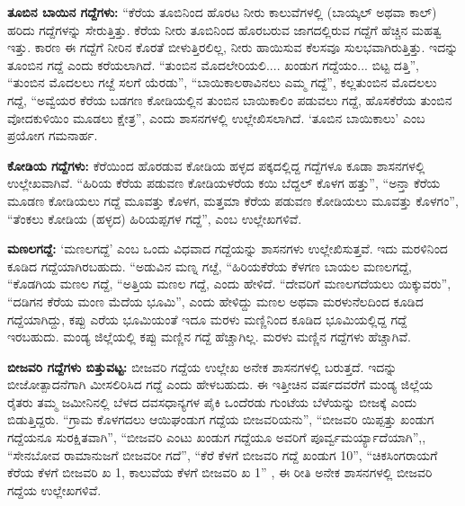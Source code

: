 \vskip 2pt

\textbf{ತೂಬಿನ ಬಾಯಿನ ಗದ್ದೆಗಳು:} “ಕೆರೆಯ ತೂಬಿನಿಂದ ಹೊರಟ ನೀರು ಕಾಲುವೆಗಳಲ್ಲಿ (ಬಾಯ್ಕಲ್​ ಅಥವಾ ಕಾಲ್​) ಹರಿದು ಗದ್ದೆಗಳನ್ನು ಸೇರುತ್ತಿತ್ತು. ಕೆರೆಯ ನೀರು ತೂಬಿನಿಂದ ಹೊರಬರುವ ಜಾಗದಲ್ಲಿರುವ ಗದ್ದೆಗೆ ಹೆಚ್ಚಿನ ಮಹತ್ವ ಇತ್ತು. ಕಾರಣ ಈ ಗದ್ದೆಗೆ ನೀರಿನ ಕೊರತೆ ಬೀಳುತ್ತಿರಲಿಲ್ಲ, ನೀರು ಹಾಯಿಸುವ ಕೆಲಸವೂ ಸುಲಭವಾಗಿರುತ್ತಿತ್ತು. ಇದನ್ನು ತೂಂಬಿನ ಗದ್ದೆ ಎಂದು ಕರೆಯಲಾಗಿದೆ. “ತುಂಬಿನ ಮೊದಲೇರಿಯಲಿ.... ಖಂಡುಗ ಗದ್ದೆಯಂ... ಬಿಟ್ಟ ದತ್ತಿ”, “ತುಂಬಿನ ಮೊದಲಲು ಗೞ್ದೆ ಸಲಗೆ ಯೆರಡು”, “ಬಾಯಿಕಾಲಠಾವಿನಲು ಎಮ್ಮ ಗದ್ದೆ”, ಕಲ್ಲತುಂಬಿನ ಮೊದಲಲು ಗದ್ದೆ, “ಅವ್ವೆಯರ ಕೆರೆಯ ಬಡಗಣ ಕೋಡಿಯಲ್ಲಿನ ತುಂಬಿನ ಬಾಯಿಕಾಲಿಂ ಪಡುವಲು ಗದ್ದೆ, ಹೊಸಕೆರೆಯ ತುಂಬಿನ ವೋದಕುಳಿಯಿಂ ಮೂಡಲು ಕ್ಷೇತ್ರ”, ಎಂದು ಶಾಸನಗಳಲ್ಲಿ ಉಲ್ಲೇಖಿಸಲಾಗಿದೆ. ‘ತೂಬಿನ ಬಾಯಿಕಾಲು’ ಎಂಬ ಪ್ರಯೋಗ ಗಮನಾರ್ಹ.

\vskip 2pt

\textbf{ಕೋಡಿಯ ಗದ್ದೆಗಳು:} ಕೆರೆಯಿಂದ ಹೊರಡುವ ಕೋಡಿಯ ಹಳ್ಳದ ಪಕ್ಕದಲ್ಲಿದ್ದ ಗದ್ದೆಗಳೂ ಕೂಡಾ ಶಾಸನಗಳಲ್ಲಿ ಉಲ್ಲೇಖವಾಗಿವೆ. “ಹಿರಿಯ ಕೆರೆಯ ಪಡುವಣ ಕೋಡಿಯಳರೆಯ ಕಯಿ ಬೆದ್ದಲ್​ ಕೊಳಗ ಹತ್ತು”, “ಅನ್ತಾ ಕೆರೆಯ ಮೂಡಣ ಕೋಡಿಯಲು ಗದ್ದೆ ಮೂವತ್ತು ಕೊಳಗ, ಮತ್ತಮಾ ಕೆರೆಯ ಪಡುವಣ ಕೋಡಿಯಲು ಮೂವತ್ತು ಕೊಳಗಂ”, “ತೆಂಕಲು ಕೋಡಿಯ (ಹಳ್ಳದ) ಹಿರಿಯಪ್ಪಗಳ ಗದ್ದೆ”, ಎಂಬ ಉಲ್ಲೇಖಗಳಿವೆ.

\textbf{ಮಣಲಗದ್ದೆ:} ‘ಮಣಲಗದ್ದೆ’ ಎಂಬ ಒಂದು ವಿಧವಾದ ಗದ್ದೆಯನ್ನು ಶಾಸನಗಳು ಉಲ್ಲೇಖಿಸುತ್ತವೆ. ಇದು ಮರಳಿನಿಂದ ಕೂಡಿದ ಗದ್ದೆಯಾಗಿರಬಹುದು. “ಅಡುವಿನ ಮಣ್ನ ಗೞ್ದೆ, “ಹಿರಿಯಕೆರೆಯ ಕೆಳಗಣ ಬಾಯಲ ಮಣಲಗದ್ದೆ, “ಕೊಡಗಿಯ ಮಣಲ ಗದ್ದೆ, “ಅತ್ತಿಯ ಮಣಲ ಗದ್ದೆ, ಎಂದು ಹೇಳಿದೆ. “ದೇವರಿಗೆ ಮಣಲಗದೆಯಲು ಯಿಕ್ಕುವರು”, “ದಡಿಗನ ಕೆರೆಯ ಮಂಣ ಮೆದೆಯ ಭೂಮಿ”, ಎಂದು ಹೇಳಿದ್ದು ಮಣಲ ಅಥವಾ ಮರಳುನೆಲದಿಂದ ಕೂಡಿದ ಗದ್ದೆಯಾಗಿದ್ದು, ಕಪ್ಪು ಎರೆಯ ಭೂಮಿಯಂತೆ ಇದೂ ಮರಳು ಮಣ್ಣಿನಿಂದ ಕೂಡಿದ ಭೂಮಿಯಲ್ಲಿದ್ದ ಗದ್ದೆ ಇರಬಹುದು. ಮಂಡ್ಯ ಜಿಲ್ಲೆಯಲ್ಲಿ ಕಪ್ಪು ಮಣ್ಣಿನ ಗದ್ದೆ ಹೆಚ್ಚಾಗಿಲ್ಲ. ಮರಳು ಮಣ್ಣಿನ ಗದ್ದೆಗಳು ಹೆಚ್ಚಾಗಿವೆ.

\textbf{ಬೀಜವರಿ ಗದ್ದೆಗಳು \general{\enginline{-}} ಬಿತ್ತುವಟ್ಟ:} ಬೀಜವರಿ ಗದ್ದೆಯ ಉಲ್ಲೇಖ ಅನೇಕ ಶಾಸನಗಳಲ್ಲಿ ಬರುತ್ತದೆ. ಇದನ್ನು ಬೀಜೋತ್ಪಾದನೆಗಾಗಿ ಮೀಸಲಿರಿಸಿದ ಗದ್ದೆ ಎಂದು ಹೇಳಬಹುದು. ಈ ಇತ್ತೀಚಿನ ವರ್ಷದವರೆಗೆ ಮಂಡ್ಯ ಜಿಲ್ಲೆಯ ರೈತರು ತಮ್ಮ ಜಮೀನಿನಲ್ಲಿ ಬೆಳದ ದವಸಧಾನ್ಯಗಳ ಪೈಕಿ ಒಂದೆರಡು ಗುಂಟೆಯ ಬೆಳೆಯನ್ನು ಬೀಜಕ್ಕೆ ಎಂದು ಬಿಡುತ್ತಿದ್ದರು. “ಗ್ರಾಮ ಕೊಳಗದಲು ಆಯಿಘಂಡುಗ ಗದ್ದೆಯ ಬೀಜವರಿಯನು”, “ಬೀಜವರಿ ಯಿಪ್ಪತ್ತು ಖಂಡುಗ ಗದ್ದೆಯನೂ ಸುರಕ್ಷಿತವಾಗಿ”, “ಬೀಜವರಿ ಎಂಟು ಖಂಡುಗ ಗದ್ದೆಯೂ ಅವರಿಗೆ ಪೂರ್ವ್ವಮರ್ಯ್ಯಾದೆಯಾಗಿ”,, “ಸೇನಬೋವ ರಾಮಾನುಜಗೆ ಬೀಜವರೀ ಗದೆ”, “ಕೆರೆ ಕೆಳಗೆ ಬೀಜವರಿ ಗದ್ದೆ ಖಂಡುಗ 10”, “ಚಿಕಸಿಂಗರಾಯಗೆ ಕೆರೆಯ ಕೆಳಗೆ ಬೀಜವರಿ ಖ 1, ಕಾಲುವೆಯ ಕೆಳಗೆ ಬೀಜವರಿ ಖ 1” , ಈ ರೀತಿ ಅನೇಕ ಶಾಸನಗಳಲ್ಲಿ ಬೀಜವರಿ ಗದ್ದೆಯ ಉಲ್ಲೇಖಗಳಿವೆ.

